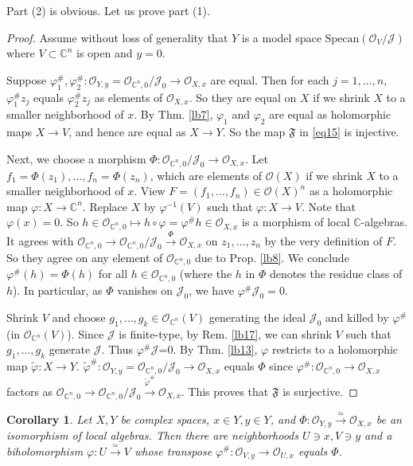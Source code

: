\documentclass[12pt,b5paper,notitlepage]{report}
\theoremstyle{definition}
\theoremstyle{plain}
\newtheorem{co}[df]{Corollary}
\newcommand{\fk}{\mathfrak}
\newcommand{\mc}{\mathcal}
\newcommand{\wtd}{\widetilde}
\newcommand{\scr}{\mathscr}
\newcommand{\Cbb}{\mathbb C}
\newcommand{\Specan}{\mathrm{Specan}}
\numberwithin{equation}{section}
\begin{document}
Part (2) is obvious. Let us prove part (1).


\begin{proof}
Assume without loss of generality that $Y$ is a model space $\Specan(\scr O_V/\mc J)$ where $V\subset\Cbb^n$ is open and $y=0$. 

Suppose $\varphi_1^\#,\varphi_2^\#:\scr O_{Y,y}=\scr O_{\Cbb^n,0}/\mc J_0\rightarrow\scr O_{X,x}$ are equal. Then for each $j=1,\dots,n$, $\varphi_1^\#z_j$ equals $\varphi_2^\#z_j$ as elements of $\scr O_{X,x}$. So they are equal on $X$ if we shrink $X$ to a smaller neighborhood of $x$. By Thm. \ref{lb7}, $\varphi_1$ and $\varphi_2$ are equal as holomorphic maps $X\rightarrow V$, and hence are equal as $X\rightarrow Y$. So the map $\fk F$ in \eqref{eq15} is injective.

Next, we choose a morphism $\Phi:\scr O_{\Cbb^n,0}/\mc J_0\rightarrow\scr O_{X,x}$. Let $f_1=\Phi(z_1),\dots,f_n=\Phi(z_n)$, which are elements of $\scr O(X)$ if we shrink $X$ to a smaller neighborhood of $x$. View $F=(f_1,\dots,f_n)\in\scr O(X)^n$ as a holomorphic map $\varphi:X\rightarrow\Cbb^n$. Replace $X$ by $\varphi^{-1}(V)$ such that $\varphi:X\rightarrow V$. Note that $\varphi(x)=0$. So $h\in\scr O_{\Cbb^n,0}\mapsto h\circ \varphi=\varphi^\#h\in\scr O_{X,x}$ is a morphism of local $\Cbb$-algebras. It agrees with $\scr O_{\Cbb^n,0}\rightarrow\scr O_{\Cbb^n,0}/\mc J_0\xrightarrow{\Phi}\scr O_{X,x}$ on $z_1,\dots,z_n$ by the very definition of $F$. So they agree on any element of $\scr O_{\Cbb^n,0}$ due to Prop. \ref{lb8}. We conclude $\varphi^\#(h)=\Phi(h)$  for all $h\in\scr O_{\Cbb^n,0}$ (where the $h$ in $\Phi$ denotes the residue class of $h$). In particular, as $\Phi$ vanishes on $\mc J_0$, we have $\varphi^\#\mc J_0=0$.

Shrink $V$ and choose $g_1,\dots,g_k\in\scr O_{\Cbb^n}(V)$ generating the ideal $\mc J_0$ and killed by $\varphi^\#$ (in $\scr O_{\Cbb^n}(V)$). Since $\mc J$ is finite-type, by Rem. \ref{lb17}, we can shrink $V$ such that $g_1,\dots,g_k$ generate $\mc J$. Thus $\varphi^\#\mc J$=0. By Thm. \ref{lb13}, $\varphi$ restricts to a holomorphic map $\wtd\varphi:X\rightarrow Y$. $\wtd\varphi^\#:\scr O_{Y,y}=\scr O_{\Cbb^n,0}/\mc J_0\rightarrow\scr O_{X,x}$ equals $\Phi$ since $\varphi^\#:\scr O_{\Cbb^n,0}\rightarrow\scr O_{X,x}$ factors as $\scr O_{\Cbb^n,0}\rightarrow\scr O_{\Cbb^n,0}/\mc J_0\xrightarrow{\wtd\varphi^\#}\scr O_{X,x}$. This proves that $\fk F$ is surjective.
\end{proof}

\begin{co}\label{lb18}
Let $X,Y$ be complex spaces, $x\in Y,y\in Y$, and $\Phi:\scr O_{Y,y}\xrightarrow{\simeq}\scr O_{X,x}$ be an isomorphism of local algebras. Then there are neighborhoods $U\ni x,V\ni y$ and a biholomorphism $\varphi:U\xrightarrow{\simeq}V$ whose transpose $\varphi^\#:\scr O_{V,y}\rightarrow\scr O_{U,x}$ equals $\Phi$.
\end{co}
\end{document}
